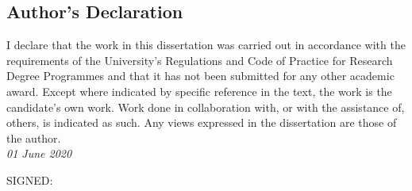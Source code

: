 \documentclass[../main]{subfiles}
\begin{document}
\newpage
\thispagestyle{fancy}
\setlength{\parindent}{10pt}

\begin{onehalfspacing}

  \vspace*{75pt}

  \section*{\huge Author's Declaration}

  I declare that the work in this dissertation was carried out in accordance with the requirements of the University's Regulations and Code of Practice for Research Degree Programmes and that it has not been submitted for any other academic award. Except where indicated by specific reference in the text, the work is the candidate's own work. Work done in collaboration with, or with the assistance of, others, is indicated as such. Any views expressed in the dissertation are those of the author.\\[-6pt]

  \textit{01 June 2020}

  \begin{flushright}
    SIGNED: \underline{\hspace{6cm}}
  \end{flushright}

\end{onehalfspacing}
\end{document}

